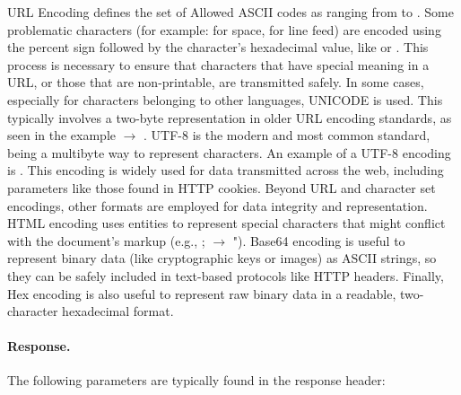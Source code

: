 URL Encoding defines the set of Allowed ASCII codes as ranging from  to . Some problematic characters (for example:  for space,  for line feed) are encoded using the percent sign followed by the character's hexadecimal value, like  or . This process is necessary to ensure that characters that have special meaning in a URL, or those that are non-printable, are transmitted safely. In some cases, especially for characters belonging to other languages, UNICODE is used. This typically involves a two-byte representation in older URL encoding standards, as seen in the example  $\rightarrow$ \NewTexttt{/}. UTF-8 is the modern and most common standard, being a multibyte way to represent characters. An example of a UTF-8 encoding is . This encoding is widely used for data transmitted across the web, including parameters like those found in HTTP cookies. Beyond URL and character set encodings, other formats are employed for data integrity and representation. HTML encoding uses entities to represent special characters that might conflict with the document's markup (e.g., ; $\rightarrow$ "). Base64 encoding is useful to represent binary data (like cryptographic keys or images) as ASCII strings, so they can be safely included in text-based protocols like HTTP headers. Finally, Hex encoding is also useful to represent raw binary data in a readable, two-character hexadecimal format.

\paragraph{Response.} The following parameters are typically found in the response header:

